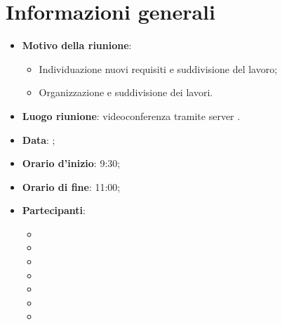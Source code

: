 \section{Informazioni generali}
\begin{itemize}
\item \textbf{Motivo della riunione}: 
\begin{itemize}
	\item Individuazione nuovi requisiti e suddivisione del lavoro;
	\item Organizzazione e suddivisione dei lavori.
\end{itemize}
\item \textbf{Luogo riunione}: videoconferenza tramite server .
\item \textbf{Data}: \Data{};
\item \textbf{Orario d'inizio}: 9:30;
\item \textbf{Orario di fine}: 11:00;
\item \textbf{Partecipanti}:
	\begin{itemize}
	\item \BM{}
	\item \SG{}
	\item \SP{}
	\item \ZM{}
	\item \PA{}
	\item \RA{}
	\item \SH{}
	\end{itemize}
\end{itemize}

\newpage
